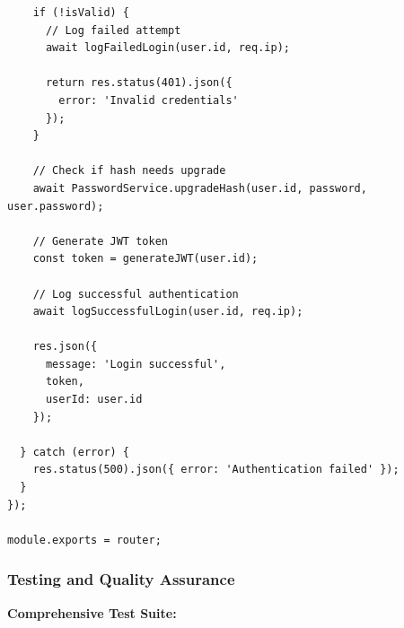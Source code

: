 \documentclass[12pt,a4paper]{article}
\begin{document}
\begin{verbatim}
    if (!isValid) {
      // Log failed attempt
      await logFailedLogin(user.id, req.ip);
      
      return res.status(401).json({ 
        error: 'Invalid credentials' 
      });
    }
    
    // Check if hash needs upgrade
    await PasswordService.upgradeHash(user.id, password, user.password);
    
    // Generate JWT token
    const token = generateJWT(user.id);
    
    // Log successful authentication
    await logSuccessfulLogin(user.id, req.ip);
    
    res.json({
      message: 'Login successful',
      token,
      userId: user.id
    });
    
  } catch (error) {
    res.status(500).json({ error: 'Authentication failed' });
  }
});

module.exports = router;
\end{verbatim}

\subsubsection{Testing and Quality Assurance}

\textbf{Comprehensive Test Suite:}
\end{document}
